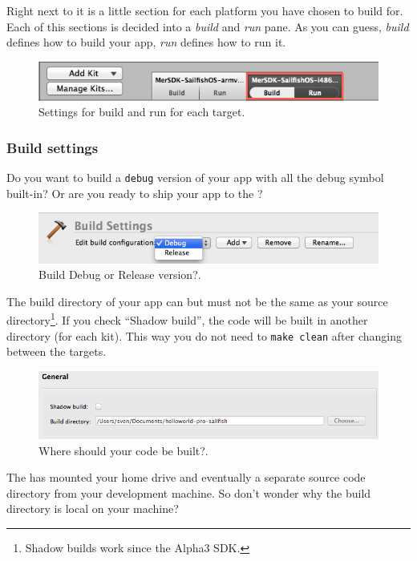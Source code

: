 Right next to it is a little section for each platform you have chosen to build for. Each of this sections is decided into a \emph{build} and \emph{run} pane. As you can guess, \emph{build} defines how to build your app, \emph{run} defines how to run it.
% 
\begin{figure}[H]
  \centering
  \includegraphics[scale=0.6]{../media/gfx/QtCreator/kitbuildrun.png} 
  \caption{Settings for build and run for each target.}
  \label{fig:kitbuildrun}
\end{figure}
%
%
\subsubsection{Build settings}\label{subsubsec:buildsettings}
%
Do you want to build a \verb,debug, version of your app with all the debug symbol built-in? Or are you ready to ship your app to the ?
%
\begin{figure}[H]
  \centering
  \includegraphics[scale=0.6]{../media/gfx/QtCreator/DebugRelease.png} 
  \caption{Build Debug or Release version?.}
  \label{fig:DebugRelease}
\end{figure}
%
The build directory of your app can but must not be the same as your source directory\footnote{Shadow builds work since the Alpha3 SDK.}. If you check ``Shadow build'', the code will be built in another directory (for each kit). This way you do not need to \verb,make clean, after changing between the targets.
%
\begin{figure}[H]
  \centering
  \includegraphics[scale=0.5]{../media/gfx/QtCreator/GeneralBuildDirectory.png} 
  \caption{Where should your code be built?.}
  \label{fig:GeneralBuildDirectory}
\end{figure}
%
The  has mounted your home drive and eventually a separate source code directory from your development machine. So don't wonder why the build directory is local on your machine?

